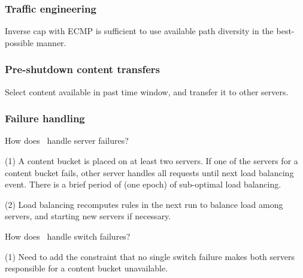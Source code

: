 %
\subsubsection{Traffic engineering}

Inverse cap with ECMP is sufficient to use available path diversity in the best-possible manner.


\subsubsection{Pre-shutdown content transfers}

Select content available in past time window, and transfer it to other servers.

\subsubsection{Failure handling}

How does \shrink\ handle server failures? 

(1) A content bucket is placed on at least two servers. If one of the servers for a content bucket fails, other server handles all requests until next load balancing event. There is a brief period of (one epoch) of sub-optimal load balancing.

(2) Load balancing recomputes rules in the next run to balance load among servers, and starting new servers if necessary.

How does \shrink\ handle switch failures?

(1) Need to add the constraint that no single switch failure makes both servers responsible for a content bucket unavailable.


